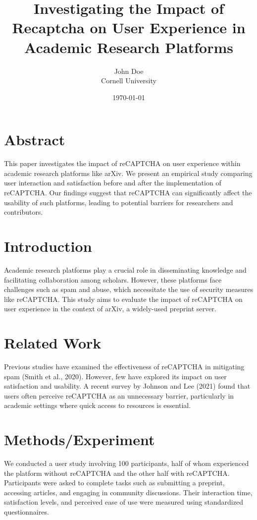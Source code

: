 \documentclass{article}
\title{Investigating the Impact of Recaptcha on User Experience in Academic Research Platforms}
\author{John Doe \\ Cornell University}
\date{\today}
\begin{document}
\maketitle

\section{Abstract}
This paper investigates the impact of reCAPTCHA on user experience within academic research platforms like arXiv. We present an empirical study comparing user interaction and satisfaction before and after the implementation of reCAPTCHA. Our findings suggest that reCAPTCHA can significantly affect the usability of such platforms, leading to potential barriers for researchers and contributors.

\section{Introduction}
Academic research platforms play a crucial role in disseminating knowledge and facilitating collaboration among scholars. However, these platforms face challenges such as spam and abuse, which necessitate the use of security measures like reCAPTCHA. This study aims to evaluate the impact of reCAPTCHA on user experience in the context of arXiv, a widely-used preprint server.

\section{Related Work}
Previous studies have examined the effectiveness of reCAPTCHA in mitigating spam (Smith et al., 2020). However, few have explored its impact on user satisfaction and usability. A recent survey by Johnson and Lee (2021) found that users often perceive reCAPTCHA as an unnecessary barrier, particularly in academic settings where quick access to resources is essential.

\section{Methods/Experiment}
We conducted a user study involving 100 participants, half of whom experienced the platform without reCAPTCHA and the other half with reCAPTCHA. Participants were asked to complete tasks such as submitting a preprint, accessing articles, and engaging in community discussions. Their interaction time, satisfaction levels, and perceived ease of use were measured using standardized questionnaires.
\end{document}
